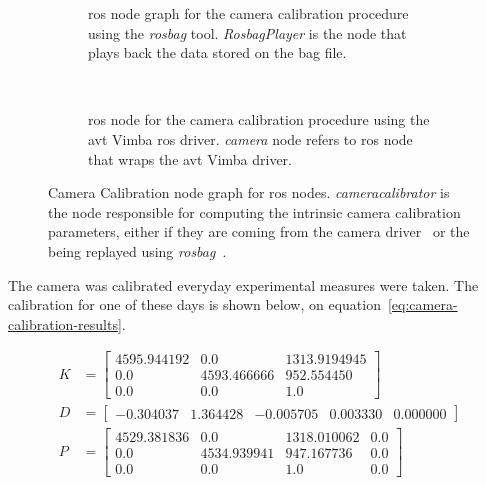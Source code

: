 \begin{figure}[H]
	\vspace{5mm}
	\centering
	\begin{subfigure}[c]{0.8\textwidth}
		\centering
		\def\svgwidth{\columnwidth}
		\graphicspath{{img/camera-calibration/}}
		
		\caption{\ac{ros} node graph for the camera calibration procedure using the \emph{rosbag} tool. \emph{RosbagPlayer} is the node that plays back the data stored on the bag file.}
		\label{fig:camera-calibration-bag-rosgraph}
	\end{subfigure}
	\vspace{5mm} \\ 
	\begin{subfigure}[c]{0.8\textwidth}
		\centering
		\def\svgwidth{\columnwidth}
		\graphicspath{{img/camera-calibration/}}
		
		\caption{\ac{ros} node for the camera calibration procedure using the \ac{avt} Vimba \ac{ros} driver. \emph{camera} node refers to \ac{ros} node that wraps the \ac{avt} Vimba driver.}
		\label{fig:camera-calibration-avt-rosgraph}
	\end{subfigure}
	\caption{Camera Calibration node graph for \ac{ros} nodes. \emph{cameracalibrator} is the node responsible for computing the intrinsic camera calibration parameters, either if they are coming from the camera driver~ or the being replayed using \emph{rosbag}~.}
	\label{fig:camera-calibration-rosgraph}
\end{figure}

The camera was calibrated everyday experimental measures were taken. The calibration for one of these days is shown below, on equation~\ref{eq:camera-calibration-results}.

\begin{subequations}
	\label{eq:camera-calibration-results}
	\begin{align}
		K & = 
		\begin{bmatrix}
			4595.944192 & 0.0         &  1313.9194945 \\
			0.0         & 4593.466666 &  952.554450 \\
			0.0         & 0.0         &  1.0
		\end{bmatrix} \\
		D & = 
		\begin{bmatrix}
			-0.304037 & 1.364428 &  -0.005705 & 0.003330 & 0.000000
		\end{bmatrix} \\
		P & = 
		\begin{bmatrix}
			4529.381836 & 0.0         & 1318.010062 & 0.0 \\
			0.0         & 4534.939941 & 947.167736  & 0.0 \\
			0.0         & 0.0         & 1.0         & 0.0 
		\end{bmatrix}
	\end{align}
\end{subequations}

